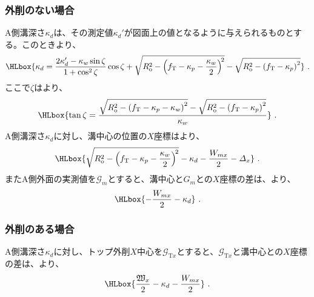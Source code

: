 \subsubsection{外削のない場合}
A側溝深さ$\kappa_d$は、その測定値$\kappa_d'$が図面上の値となるように与えられるものとする。このときより、
\begin{align*}
  \HLbox{%
    \kappa_d
    = \frac{2\kappa_d'-\kappa_w\sin\zeta}{1+\cos^2\zeta}\cos\zeta
      +\sqrt{R_\mathrm o^2-\left(f_\mathrm T-\kappa_p-\frac{\kappa_w}2\right)^{\!2}}
      -\sqrt{R_\mathrm o^2-\left(f_\mathrm T-\kappa_p\right)^2}%
  }\ .
\end{align*}
ここで$\zeta$はより、
\begin{align*}
  \HLbox{%
    \tan\zeta
    = \frac{\sqrt{R_\mathrm o^2-\left(f_\mathrm T-\kappa_p-\kappa_w\right)^2}
            -\sqrt{R_\mathrm o^2-\left(f_\mathrm T-\kappa_p\right)^2}}
           {\kappa_w}%
  }\ .
\end{align*}
A側溝深さ$\kappa_d$に対し、溝中心の位置の$X$座標はより、
\begin{align*}
  \HLbox{%
    \sqrt{R_\mathrm o^2-\left(f_\mathrm T-\kappa_p-\frac{\kappa_w}2\right)^{\!2}}
    -\kappa_d
    -\frac{W_{mx}}2
    -\varDelta_x%
  }\ .
\end{align*}
またA側外面の実測値を$\mathcal G_m$とすると、溝中心と$G_m$との$X$座標の差は、より、
\begin{align*}
  \HLbox{-\frac{W_{mx}}2-\kappa_d}\ .
\end{align*}

\clearpage
\subsubsection{外削のある場合}
A側溝深さ$\kappa_d$に対し、トップ外削$X$中心を$\mathcal G_{\mathrm Tx}$とすると、$\mathcal G_{\mathrm Tx}$と溝中心との$X$座標の差は、より、
\begin{align*}
  \HLbox{\frac{\mathfrak W_x}2-\kappa_d-\frac{W_{mx}}2}\ .
\end{align*}



